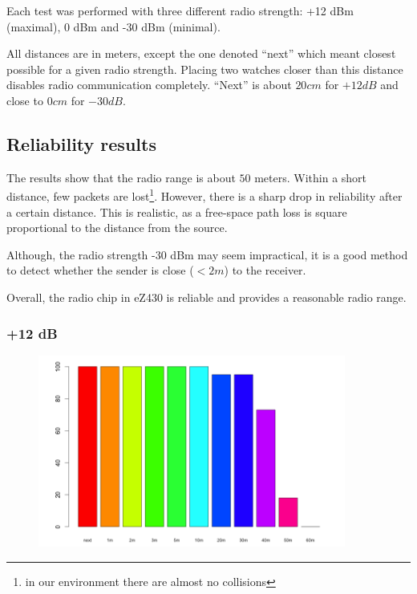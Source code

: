 Each test was performed with three different radio strength: +12 dBm (maximal), 0 dBm and -30 dBm (minimal).

All distances are in meters, except the one denoted ``next''  which meant closest possible for a given radio strength.
Placing two watches closer than this distance disables radio communication completely.
``Next'' is about $20 cm$ for $+12 dB$ and close to $0 cm$ for $- 30 dB$.



\subsection{Reliability results}

The results show that the radio range is about $50$ meters.
Within a short distance, few packets are lost\footnote{in our environment there are almost no collisions}.
However, there is a sharp drop in reliability after a certain distance.
This is realistic, as a free-space path loss is square proportional to the distance from the source.

Although, the radio strength -30 dBm may seem impractical, it is a good method to detect whether the sender is close ($< 2m$) to the receiver.

Overall, the radio chip in eZ430 is reliable and provides a reasonable radio range.


\subsubsection{+12 dB}

\begin{figure}[H]
  \centering
  \includegraphics[width=0.9\textwidth]{img/tests/range/db_12.png}
\end{figure}


